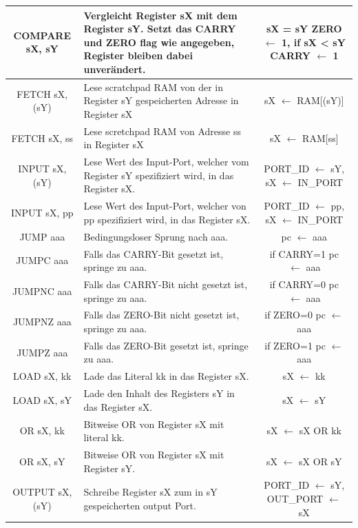 \documentclass{scrartcl}
\begin{document}
\begin{longtable}{||c|p{4cm}|c||}
         COMPARE sX, sY & Vergleicht Register sX mit dem Register sY. Setzt das CARRY und ZERO flag wie angegeben, Register bleiben dabei unverändert. & \makecell{sX = sY ZERO $\leftarrow$ 1, \\ if sX \textless $ $ sY CARRY $\leftarrow$ 1  }  \\ \hline
         FETCH sX, (sY) & Lese scratchpad RAM von der in Register sY gespeicherten Adresse in Register sX &sX $\leftarrow$ RAM[(sY)]   \\ \hline
         FETCH sX, ss & Lese scretchpad RAM von Adresse ss in Register sX &sX $\leftarrow$ RAM[ss]  \\ \hline
         INPUT sX, (sY) & Lese Wert des Input-Port, welcher vom Register sY spezifiziert wird, in das Register sX. &PORT\_ID $\leftarrow$ sY, sX $\leftarrow$ IN\_PORT  \\ \hline
         INPUT sX, pp & Lese Wert des Input-Port, welcher von pp spezifiziert wird, in das Register sX. &PORT\_ID $\leftarrow$ pp, sX $\leftarrow$ IN\_PORT \\ \hline
         JUMP aaa & Bedingungsloser Sprung nach aaa. &pc $\leftarrow$ aaa  \\ \hline
         JUMPC aaa & Falls das CARRY-Bit gesetzt ist, springe zu aaa. & if CARRY=1 pc $\leftarrow$ aaa \\ \hline
         JUMPNC aaa & Falls das CARRY-Bit nicht gesetzt ist, springe zu aaa. &if CARRY=0 pc $\leftarrow$ aaa  \\ \hline
         JUMPNZ aaa & Falls das ZERO-Bit nicht gesetzt ist, springe zu aaa. &if ZERO=0 pc $\leftarrow$ aaa  \\ \hline
         JUMPZ aaa & Falls das ZERO-Bit gesetzt ist, springe zu aaa. &if ZERO=1 pc $\leftarrow$ aaa  \\ \hline 
         LOAD sX, kk & Lade das Literal kk in das Register sX. &sX $\leftarrow$ kk   \\ \hline
         LOAD sX, sY & Lade den Inhalt des Registers sY in das Register sX. &sX $\leftarrow$ sY  \\ \hline 
         OR sX, kk & Bitweise OR von Register sX mit literal kk. &sX $\leftarrow$ sX OR kk   \\ \hline
         OR sX, sY & Bitweise OR von Register sX mit Register sY. & sX $\leftarrow$ sX OR sY   \\ \hline
         OUTPUT sX, (sY) & Schreibe Register sX zum in sY gespeicherten output Port. &PORT\_ID $\leftarrow$ sY, OUT\_PORT $\leftarrow$ sX  \\ \hline

\end{longtable}
\end{document}
